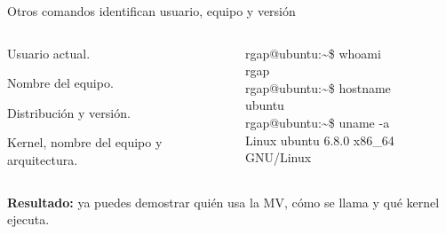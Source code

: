 \documentclass[aspectratio=169,10pt,c]{beamer}
\begin{document}
\begin{frame}{Otros comandos identifican usuario, equipo y versión}
\begin{columns}[T,onlytextwidth]
\begin{description}\small
  \item[\texttt{whoami}] Usuario actual.
  \item[\texttt{hostname}] Nombre del equipo.
  \item[\texttt{cat /etc/os-release}] Distribución y versión.
  \item[\texttt{uname -a}] Kernel, nombre del equipo y arquitectura.
\end{description}
\begin{terminal}
rgap@ubuntu:\textasciitilde\$ whoami\\
rgap\\
rgap@ubuntu:\textasciitilde\$ hostname\\
ubuntu\\
rgap@ubuntu:\textasciitilde\$ uname -a\\
Linux ubuntu 6.8.0 x86\_64 GNU/Linux
\end{terminal}
\end{columns}
\vspace{3mm}
\small\textbf{Resultado:} ya puedes demostrar quién usa la MV, cómo se llama y qué kernel ejecuta.
\end{frame}
\end{document}
